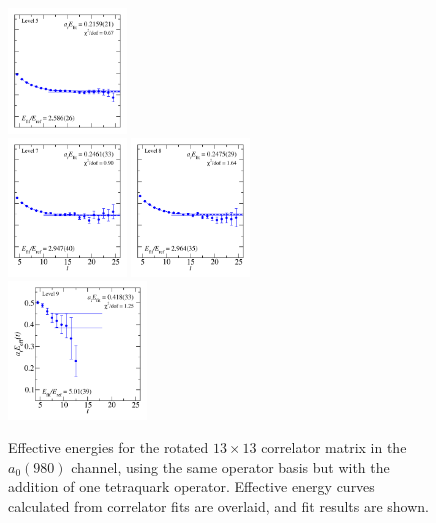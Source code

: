 \begin{figure}
  \includegraphics[width=0.28\textwidth]{figures/spectrum_a1gm/with_tq/fits/fit_5.pdf}\\
  \includegraphics[width=0.28\textwidth]{figures/spectrum_a1gm/with_tq/fits/fit_7.pdf}
  \includegraphics[width=0.28\textwidth]{figures/spectrum_a1gm/with_tq/fits/fit_8.pdf}\\[-0.4cm]
  \includegraphics[width=0.329\textwidth]{figures/spectrum_a1gm/with_tq/fits/fit_9.pdf}
  \caption{Effective energies for the rotated $13\times 13$ correlator matrix in the $a_0(980)$ channel, using the same operator basis but with the addition of one tetraquark operator. Effective energy curves calculated from correlator fits are overlaid, and fit results are shown.}
  \label{fig:a0_with_tq_grid}
\end{figure}

